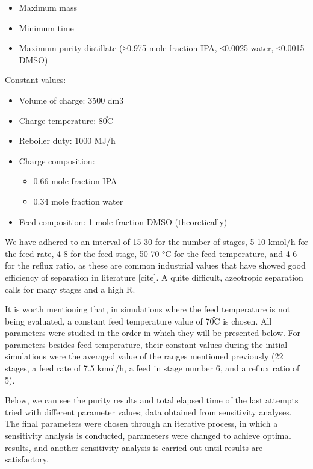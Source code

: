 \begin{itemize}
\tightlist
\item
  Maximum mass
\item
  Minimum time
\item
  Maximum purity distillate (≥0.975 mole fraction IPA, ≤0.0025 water,
  ≤0.0015 DMSO)
\end{itemize}

Constant values:

\begin{itemize}
\tightlist
\item
  Volume of charge: 3500 dm3
\item
  Charge temperature: 80֯C
\item
  Reboiler duty: 1000 MJ/h
\item
  Charge composition:

  \begin{itemize}
  \tightlist
  \item
    0.66 mole fraction IPA
  \item
    0.34 mole fraction water
  \end{itemize}
\item
  Feed composition: 1 mole fraction DMSO (theoretically)
\end{itemize}

We have adhered to an interval of 15-30 for the number of stages, 5-10
kmol/h for the feed rate, 4-8 for the feed stage, 50-70 °C for the feed
temperature, and 4-6 for the reflux ratio, as these are common
industrial values that have showed good efficiency of separation in
literature {[}cite{]}. A quite difficult, azeotropic separation calls
for many stages and a high R.

It is worth mentioning that, in simulations where the feed temperature
is not being evaluated, a constant feed temperature value of 70֯C is
chosen. All parameters were studied in the order in which they will be
presented below. For parameters besides feed temperature, their constant
values during the initial simulations were the averaged value of the
ranges mentioned previously (22 stages, a feed rate of 7.5 kmol/h, a
feed in stage number 6, and a reflux ratio of 5).

Below, we can see the purity results and total elapsed time of the last
attempts tried with different parameter values; data obtained from
sensitivity analyses. The final parameters were chosen through an
iterative process, in which a sensitivity analysis is conducted,
parameters were changed to achieve optimal results, and another
sensitivity analysis is carried out until results are satisfactory.

